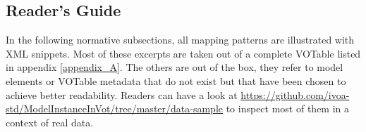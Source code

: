 \subsection{Reader's Guide}

In the following normative subsections, all mapping patterns are illustrated with XML snippets.
Most of these excerpts are taken out of a complete VOTable listed in appendix \ref{appendix_A}.
The others are out of the box, they refer to model elements or VOTable metadata that do not exist 
but that have been chosen to achieve better readability. 
Readers can have a look at \url{https://github.com/ivoa-std/ModelInstanceInVot/tree/master/data-sample} 
to inspect most of them in a context of real data.
